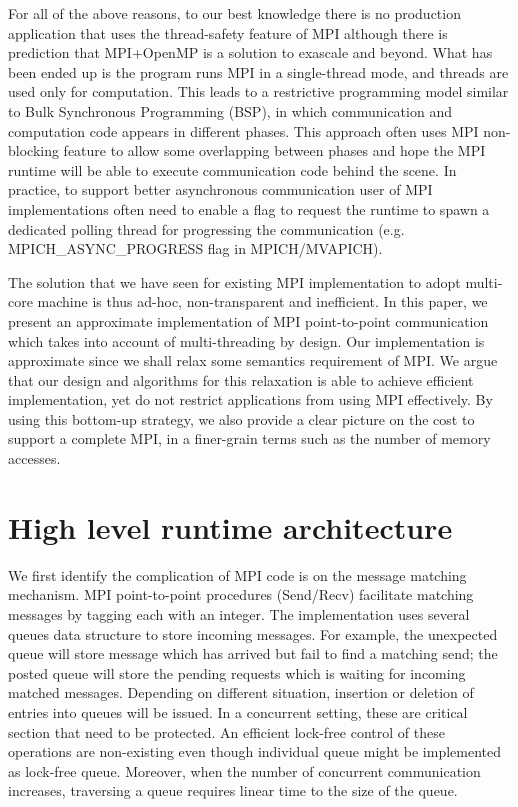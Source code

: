 \documentclass[11pt]{article}
\begin{document}
For all of the above reasons, to our best knowledge there is no production
application that uses the thread-safety feature of MPI although there is
prediction that MPI+OpenMP is a solution to exascale and beyond. What has been
ended up is the program runs MPI in a single-thread mode, and
threads are used only for computation. This leads to a restrictive
programming model similar to Bulk Synchronous Programming (BSP), in which
communication and computation code appears in different phases. This approach
often uses MPI non-blocking feature to allow some overlapping between phases
and hope the MPI runtime will be able to execute communication code behind the
scene. In practice, to support better asynchronous communication user of MPI
implementations often need to enable a flag to request the runtime to spawn a
dedicated polling thread for progressing the communication (e.g.
MPICH_ASYNC_PROGRESS flag in MPICH/MVAPICH).

The solution that we have seen for existing MPI implementation to adopt
multi-core machine is thus ad-hoc, non-transparent and inefficient. In this
paper, we present an approximate implementation of MPI point-to-point
communication which takes into account of multi-threading by design. Our
implementation is approximate since we shall relax some semantics requirement
of MPI. We argue that our design and algorithms for this relaxation is able to
achieve efficient implementation, yet do not restrict applications from using
MPI effectively. By using this bottom-up strategy, we also provide a clear
picture on the cost to support a complete MPI, in a finer-grain terms
such as the number of memory accesses.

\section{High level runtime architecture}
We first identify the complication of MPI code is on the message matching
mechanism. MPI point-to-point procedures (Send/Recv) facilitate matching
messages by tagging each with an integer. The implementation uses several
queues data structure to store incoming messages. For example, the unexpected
queue will store message which has arrived but fail to find a matching send;
the posted queue will store the pending requests which is waiting for incoming
matched messages.  Depending on different situation, insertion or deletion of
entries into queues will be issued. In a concurrent setting, these are critical
section that need to be protected. An efficient lock-free control of these
operations are non-existing even though individual queue might be implemented
as lock-free queue. Moreover, when the number of concurrent communication
increases, traversing a queue requires linear time to the size of the queue.
\end{document}
